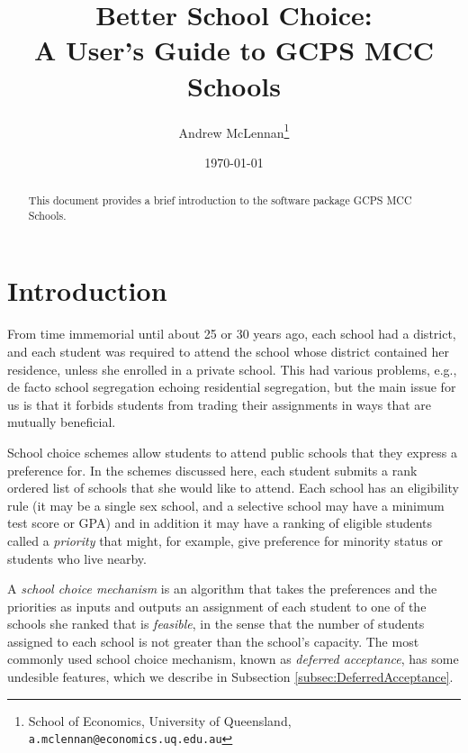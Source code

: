 \documentclass[12pt]{article}
\theoremstyle{definition}
\begin{document}
\title{Better School Choice: \\A User's Guide to GCPS MCC Schools}

\author{Andrew McLennan\footnote{School of Economics, University of
    Queensland, {\tt a.mclennan@economics.uq.edu.au}}}

\date{\today}

\maketitle

\begin{abstract}
This document provides a brief introduction to the software package GCPS MCC Schools.
\end{abstract}


\section{Introduction}

From time immemorial until about 25 or 30 years ago, each school had a
district, and each student was required to attend the school whose
district contained her residence, unless she enrolled in a private
school.  This had various problems, e.g., de facto school segregation
echoing residential segregation, but the main issue for us is that it
forbids students from trading their assignments in ways that are
mutually beneficial.

School choice schemes allow students to attend public schools that
they express a preference for.  In the schemes discussed here, each
student submits a rank ordered list of schools that she would like to
attend.  Each school has an eligibility rule (it may be a single sex
school, and a selective school may have a minimum test score or GPA)
and in addition it may have a ranking of eligible students called a
\emph{priority} that might, for example, give preference for minority
status or students who live nearby.

A \emph{school choice mechanism} is an algorithm that takes the
preferences and the priorities as inputs and outputs an assignment of
each student to one of the schools she ranked that is \emph{feasible},
in the sense that the number of students assigned to each school is
not greater than the school's capacity.  The most commonly used school
choice mechanism, known as \emph{deferred acceptance}, has some
undesible features, which we describe in Subsection
\ref{subsec:DeferredAcceptance}.
\end{document}
